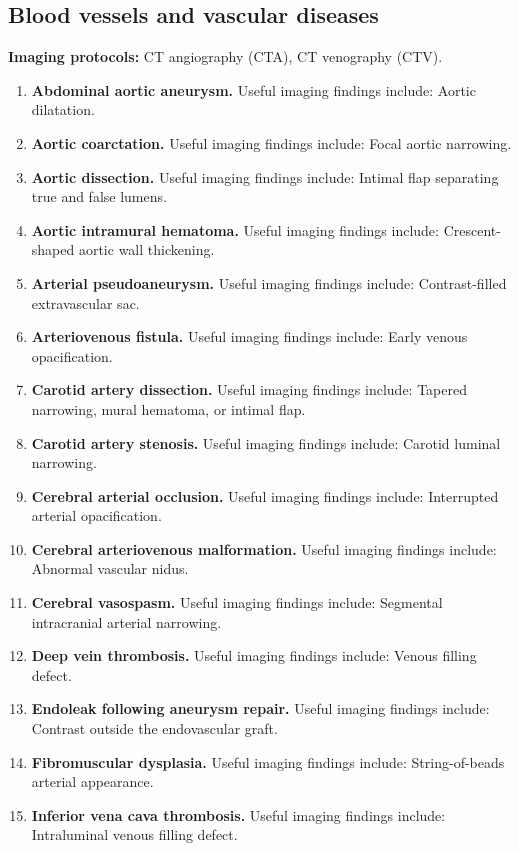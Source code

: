 \subsection{Blood vessels and vascular diseases}
\textbf{Imaging protocols:} CT angiography (CTA), CT venography (CTV).

\begin{enumerate}[leftmargin=*,itemsep=0.45em,topsep=0.4em]
\item \textbf{Abdominal aortic aneurysm.} Useful imaging findings include: Aortic dilatation.
\item \textbf{Aortic coarctation.} Useful imaging findings include: Focal aortic narrowing.
\item \textbf{Aortic dissection.} Useful imaging findings include: Intimal flap separating true and false lumens.
\item \textbf{Aortic intramural hematoma.} Useful imaging findings include: Crescent-shaped aortic wall thickening.
\item \textbf{Arterial pseudoaneurysm.} Useful imaging findings include: Contrast-filled extravascular sac.
\item \textbf{Arteriovenous fistula.} Useful imaging findings include: Early venous opacification.
\item \textbf{Carotid artery dissection.} Useful imaging findings include: Tapered narrowing, mural hematoma, or intimal flap.
\item \textbf{Carotid artery stenosis.} Useful imaging findings include: Carotid luminal narrowing.
\item \textbf{Cerebral arterial occlusion.} Useful imaging findings include: Interrupted arterial opacification.
\item \textbf{Cerebral arteriovenous malformation.} Useful imaging findings include: Abnormal vascular nidus.
\item \textbf{Cerebral vasospasm.} Useful imaging findings include: Segmental intracranial arterial narrowing.
\item \textbf{Deep vein thrombosis.} Useful imaging findings include: Venous filling defect.
\item \textbf{Endoleak following aneurysm repair.} Useful imaging findings include: Contrast outside the endovascular graft.
\item \textbf{Fibromuscular dysplasia.} Useful imaging findings include: String-of-beads arterial appearance.
\item \textbf{Inferior vena cava thrombosis.} Useful imaging findings include: Intraluminal venous filling defect.

\end{enumerate}
